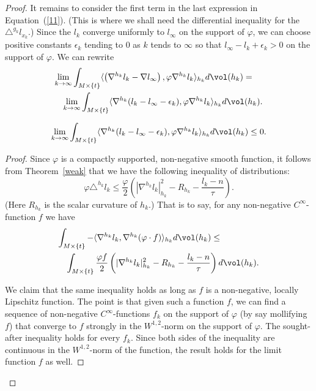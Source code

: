 \begin{proof}
It remains to consider the first term in the last expression in
Equation~(\ref{11}). (This is where we shall need the differential
inequality for the $\triangle^{g_k}l_{x_k}$.) Since the $l_k$
converge uniformly to $l_\infty$ on the support of $\varphi$, we can
choose positive constants $\epsilon_k$ tending to  $0$ as $k$ tends
to $\infty$ so that $l_\infty- l_k+\epsilon_k>0$ on the support of
$\varphi$. We can rewrite
\begin{eqnarray*}\lefteqn{\lim_{k\rightarrow\infty}\int_{M\times\{t\}}\langle\left(\nabla^{h_k}
l_k-\nabla l_\infty\right),\varphi\nabla^{h_k} l_k\rangle_{h_k}
d\vol(h_k) = } \\
& & \lim_{k\rightarrow\infty}\int_{M\times\{t\}}\langle\nabla^{h_k}(
l_k-l_\infty-\epsilon_k),\varphi\nabla^{h_k}l_k\rangle_{h_k} d\vol(h_k).\end{eqnarray*}
\begin{claim}\label{claim:nabla-convergence-limsup-bound}
$$\lim_{k\rightarrow\infty}\int_{M\times\{t\}}\langle\nabla^{h_k}(l_k-l_\infty-\epsilon_k),
\varphi\nabla^{h_k}  l_k\rangle_{h_k} d\vol(h_k)\le 0.$$
\end{claim}

\begin{proof}
Since $\varphi$ is a compactly supported, non-negative smooth
function, it follows from Theorem~\ref{weak} that we have the
following inequality of distributions:
$$\varphi\triangle^{h_k} l_k\le
\frac{\varphi}{2}\left(|\nabla^{h_k} l_k|_{h_k}^2-R_{h_k}-\frac{
l_k-n}{\tau}\right).$$ (Here $R_{h_k}$ is the scalar curvature of
$h_k$.)
 That is to say, for any non-negative
$C^\infty$-function $f$ we have
\begin{eqnarray*}
\lefteqn{\int_{M\times\{t\}}-\langle\nabla^{h_k}
l_k,\nabla^{h_k}(\varphi \cdot f)\rangle_{h_k} d\vol(h_k) \le}
\\
& & \int_{M\times\{t\}}\frac{\varphi f}{2}\left(|\nabla^{h_k}
l_k|_{h_k}^2-R_{h_k}-\frac{l_k-n}{\tau}\right)d\vol(h_k).
\end{eqnarray*}

We claim that the same inequality holds as long as $f$ is a
non-negative, locally  Lipschitz function. The point is that given
such a function $f$, we can find a sequence of non-negative
$C^\infty$-functions $f_k$ on the support of $\varphi$ (by say
mollifying $f$)  that converge to $f$ strongly in the $W^{1,2}$-norm
on the support of $\varphi$. The sought-after inequality holds for
every $f_k$. Since both sides of the inequality are continuous in
the $W^{1,2}$-norm of the function, the result holds for the limit
function $f$ as well.


\end{proof}
\end{proof}
